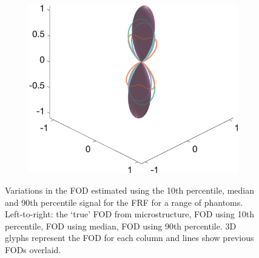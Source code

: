 \begin{figure}
{\begin{minipage}[c]{\textwidth}
\begin{subfigure}[]{0.245\textwidth}
    \includegraphics[width=\textwidth]{figures/frf_experiment/EMfibres_fod_3D_b_3000n_4_f1}
  \end{subfigure}
  \end{minipage}
}
  
  \caption[Imapct of the FRF variability on FOD estimation]{Variations in the \ac{FOD} estimated using the 10th percentile, median and 90th percentile signal for the \ac{FRF} for a range of phantoms. Left-to-right: the `true' \ac{FOD} from microstructure, \ac{FOD} using 10th percentile, \ac{FOD} using median, \ac{FOD} using 90th percentile. 3D glyphs represent the \ac{FOD} for each column and lines show previous \acp{FOD} overlaid. }
  \label{fig:frf_fod_kappa_b2000}
\end{figure}

